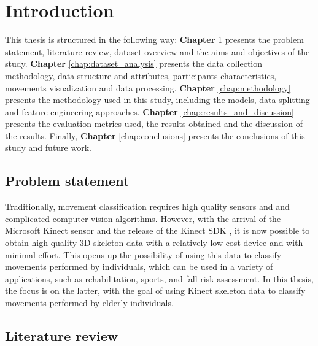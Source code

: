 \hypersetup{colorlinks=true, linkcolor=blue, citecolor=red}

\chapter{Introduction} \label{chap:introduction}

    This thesis is structured in the following way: \textbf{Chapter} \ref{chap:introduction} presents the problem statement, literature review, dataset overview and the aims and objectives of the study. \textbf{Chapter} \ref{chap:dataset_analysis} presents the data collection methodology, data structure and attributes, participants characteristics, movements visualization and data processing. \textbf{Chapter} \ref{chap:methodology} presents the methodology used in this study, including the models, data splitting and feature engineering approaches. \textbf{Chapter} \ref{chap:results_and_discussion} presents the evaluation metrics used, the results obtained and the discussion of the results. Finally, \textbf{Chapter} \ref{chap:conclusions} presents the conclusions of this study and future work.

   \section{Problem statement}

      Traditionally, movement classification requires high quality sensors and and complicated computer vision algorithms. However, with the arrival of the Microsoft Kinect sensor and the release of the Kinect SDK \cite{jana_kinect_2012}, it is now possible to obtain high quality 3D skeleton data with a relatively low cost device and with minimal effort. This opens up the possibility of using this data to classify movements performed by individuals, which can be used in a variety of applications, such as rehabilitation, sports, and fall risk assessment. In this thesis, the focus is on the latter, with the goal of using Kinect skeleton data to classify movements performed by elderly individuals.
  
   \section{Literature review}

